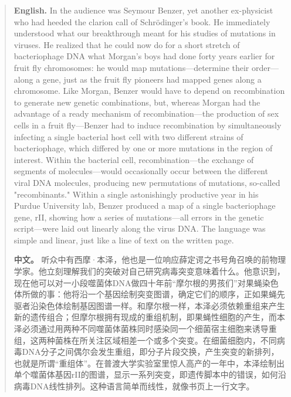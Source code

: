 \begin{quote}
\noindent\textbf{English.} In the audience was Seymour Benzer, yet another ex-physicist who had heeded the clarion call of Schrödinger's book. He immediately understood what our breakthrough meant for his studies of mutations in viruses. He realized that he could now do for a short stretch of bacteriophage DNA what Morgan's boys had done forty years earlier for fruit fly chromosomes: he would map mutations---determine their order---along a gene, just as the fruit fly pioneers had mapped genes along a chromosome. Like Morgan, Benzer would have to depend on recombination to generate new genetic combinations, but, whereas Morgan had the advantage of a ready mechanism of recombination---the production of sex cells in a fruit fly---Benzer had to induce recombination by simultaneously infecting a single bacterial host cell with two different strains of bacteriophage, which differed by one or more mutations in the region of interest. Within the bacterial cell, recombination---the exchange of segments of molecules---would occasionally occur between the different viral DNA molecules, producing new permutations of mutations, so-called "recombinants." Within a single astonishingly productive year in his Purdue University lab, Benzer produced a map of a single bacteriophage gene, rII, showing how a series of mutations---all errors in the genetic script---were laid out linearly along the virus DNA. The language was simple and linear, just like a line of text on the written page.

\smallskip
\noindent\textbf{中文。} 听众中有西摩·本泽，他也是一位响应薛定谔之书号角召唤的前物理学家。他立刻理解我们的突破对自己研究病毒突变意味着什么。他意识到，现在他可以对一小段噬菌体DNA做四十年前“摩尔根的男孩们”对果蝇染色体所做的事：他将沿一个基因绘制突变图谱，确定它们的顺序，正如果蝇先驱者沿染色体绘制基因图谱一样。和摩尔根一样，本泽必须依赖重组来产生新的遗传组合；但摩尔根拥有现成的重组机制，即果蝇性细胞的产生，而本泽必须通过用两种不同噬菌体菌株同时感染同一个细菌宿主细胞来诱导重组，这两种菌株在所关注区域相差一个或多个突变。在细菌细胞内，不同病毒DNA分子之间偶尔会发生重组，即分子片段交换，产生突变的新排列，也就是所谓“重组体”。在普渡大学实验室里惊人高产的一年中，本泽绘制出单个噬菌体基因rII的图谱，显示一系列突变，即遗传脚本中的错误，如何沿病毒DNA线性排列。这种语言简单而线性，就像书页上一行文字。
\end{quote}

